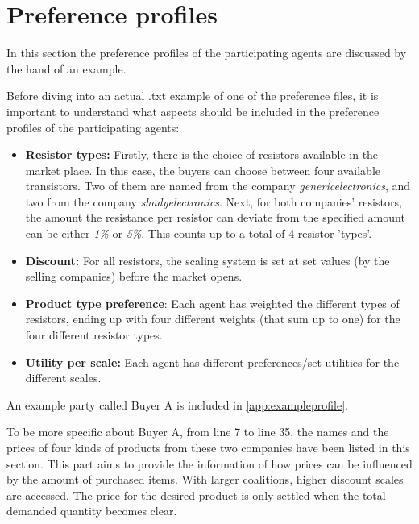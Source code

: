 \section{Preference profiles}
\label{sec:preferenceprofiles}

    In this section the preference profiles of the participating agents are discussed by the hand of an example.

    Before diving into an actual .txt example of one of the preference files, it is important to understand what aspects should be included in the preference profiles of the participating agents:

    \begin{itemize}
        \item \textbf{Resistor types:}
            Firstly, there is the choice of resistors available in the market place. In this case, the buyers can choose between four available transistors. Two of them are named from the company \textit{genericelectronics}, and two from the company \textit{shadyelectronics}. Next, for both companies' resistors, the amount the resistance per resistor can deviate from the specified amount can be either \textit{1\%} or \textit{5\%}. This counts up to a total of 4 resistor 'types'.  %
        \item \textbf{Discount:}
            For all resistors, the scaling system is set at set values (by the selling companies) before the market opens. 
        \item \textbf{Product type preference}:
            Each agent has weighted the different types of resistors, ending up with four different weights (that sum up to one) for the four different resistor types.
        \item \textbf{Utility per scale:}
            Each agent has different preferences/set utilities for the different scales. 
    \end{itemize}

    An example party called Buyer A is included in \autoref{app:exampleprofile}.

    To be more specific about Buyer A, from line 7 to line 35, the names and the prices of four kinds of products from these two companies have been listed in this section. This part aims to provide the information of how prices can be influenced by the amount of purchased items. With larger coalitions, higher discount scales are accessed. The price for the desired product is only settled when the total demanded quantity becomes clear. 
    

